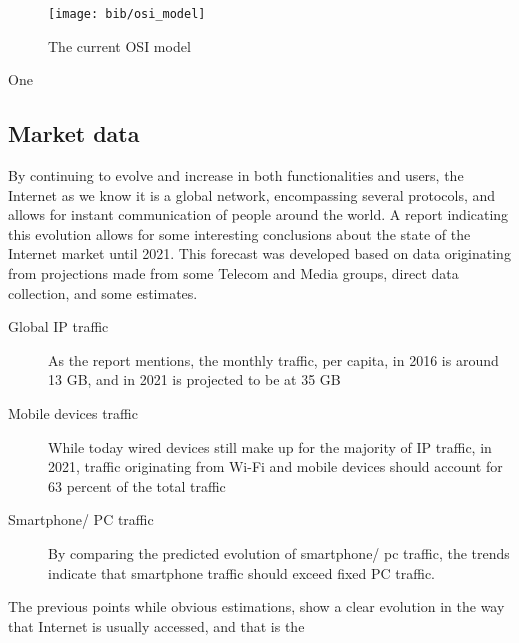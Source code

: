\begin{figure}[!tbph]
  \centering
  \texttt{[image: bib/osi\_model]}
  \label{fig:osi_model}
  \caption{The current OSI model}
\end{figure}

One 

\subsection {Market data}
\hspace {5mm} 

\p By continuing to evolve and increase in both functionalities and users, the Internet as we know it is a global network, encompassing several protocols, and allows for instant communication of people around the world.
A report indicating this evolution allows for some interesting conclusions about the state of the Internet market until 2021. This forecast was developed based on data originating from projections made from some 
Telecom and Media groups, direct data collection, and some estimates.

\begin {description}
    \item [Global IP traffic] As the report mentions, the monthly traffic, per capita, in 2016 is around 13 GB, and in 2021 is projected to be at 35 GB
    \item [Mobile devices traffic] While today wired devices still make up for the majority of IP traffic, in 2021, traffic originating from Wi-Fi and mobile devices should account for 63 percent of the total traffic
    \item [Smartphone/ PC traffic] By comparing the predicted evolution of smartphone/ pc traffic, the trends indicate that smartphone traffic should exceed fixed PC traffic.
\end {description}

\p The previous points while obvious estimations, show a clear evolution in the way that Internet is usually accessed, and that is the 


 

